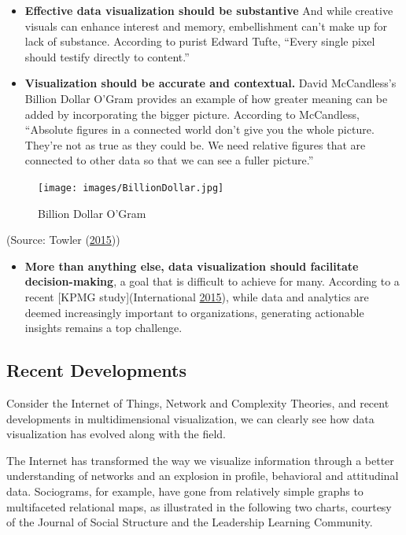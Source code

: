 \documentclass[]{book}
\providecommand{\tightlist}{%
  \setlength{\itemsep}{0pt}\setlength{\parskip}{0pt}}
\begin{document}
\begin{itemize}
\item
  \textbf{Effective data visualization should be substantive} And while creative visuals can enhance interest and memory, embellishment can't make up for lack of substance. According to purist Edward Tufte, ``Every single pixel should testify directly to content.''
\item
  \textbf{Visualization should be accurate and contextual.} David McCandless's Billion Dollar O'Gram provides an example of how greater meaning can be added by incorporating the bigger picture. According to McCandless, ``Absolute figures in a connected world don't give you the whole picture. They're not as true as they could be. We need relative figures that are connected to other data so that we can see a fuller picture.''
\end{itemize}

\begin{figure}
\centering
\texttt{[image: images/BillionDollar.jpg]}
\caption{Billion Dollar O'Gram}
\end{figure}

(Source: Towler (\protect\hyperlink{ref-future_viz}{2015}))

\begin{itemize}
\tightlist
\item
  \textbf{More than anything else, data visualization should facilitate decision-making}, a goal that is difficult to achieve for many. According to a recent {[}KPMG study{]}(International \protect\hyperlink{ref-kpmg}{2015}), while data and analytics are deemed increasingly important to organizations, generating actionable insights remains a top challenge.
\end{itemize}

\hypertarget{recent-developments}{%
\subsection{Recent Developments}\label{recent-developments}}

Consider the Internet of Things, Network and Complexity Theories, and recent developments in multidimensional visualization, we can clearly see how data visualization has evolved along with the field.

The Internet has transformed the way we visualize information through a better understanding of networks and an explosion in profile, behavioral and attitudinal data. Sociograms, for example, have gone from relatively simple graphs to multifaceted relational maps, as illustrated in the following two charts, courtesy of the Journal of Social Structure and the Leadership Learning Community.
\end{document}
